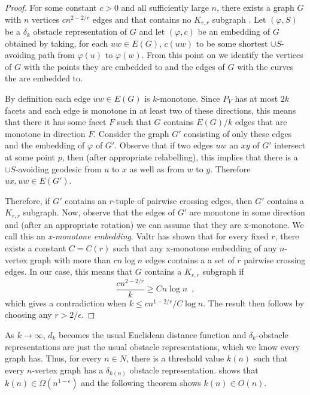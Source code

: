 \documentclass{patmorin}
\begin{document}
\begin{proof}
   For some constant $c>0$ and all sufficiently large $n$, there exists
   a graph $G$ with $n$ vertices $cn^{2-2/r}$ edges and that
   contains no $K_{r,r}$ subgraph \cite{X}.  Let $(\varphi,S)$ be a $\delta_k$
   obstacle representation of $G$ and let $(\varphi,c)$ be an embedding
   of $G$ obtained by taking, for each $uw\in E(G)$, $c(uw)$ to be some
   shortest $\cup S$-avoiding path from $\varphi(u)$ to $\varphi(w)$.
   From this point on we identify the vertices of $G$ with the points
   they are embedded to and the edges of $G$ with the curves the are
   embedded to.

   By definition each edge $uw\in E(G)$ is $k$-monotone.  Since $P_V$ has
   at most $2k$ facets and each edge is monotone in at least two of these
   directions, this means that there it has some facet $F$ such that $G$
   contains $E(G)/k$ edges that are monotone in direction $F$.  Consider
   the graph $G'$ consisting of only these edges and the embedding of
   $\varphi$ of $G'$.   Observe that if two edges $uw$ an $xy$ of $G'$
   intersect at some point $p$, then (after appropriate relabelling),
   this implies that there is a $\cup S$-avoiding geodesic from $u$ to $x$
   as well as from $w$ to $y$.  Therefore $ux,uw\in E(G')$.

   Therefore, if $G'$ contains an $r$-tuple of pairwise crossing edges,
   then $G'$ contains a $K_{r,r}$ subgraph.  Now, observe that the edges
   of $G'$ are monotone in some direction and (after an appropriate
   rotation) we can assume that they are x-monotone.  We call this an
   \emph{x-monotone embedding}.   Valtr \cite{X} has shown that for every
   fixed $r$, there exists a constant $C=C(r)$ such that any x-monotone
   embedding of any $n$-vertex graph with more than $cn\log n$ edges
   contains a a set of $r$ pairwise crossing edges.  In our case, this
   means that $G$ contains a $K_{r,r}$ subgraph if
   \[
       \frac{cn^{2-2/r}}{k} \ge Cn\log n \enspace ,
   \] 
   which gives a contradiction when $k\le cn^{1-2/r}/C\log n$.   The result
   then follows by choosing any $r>2/\epsilon$.
\end{proof}

As $k\to\infty$, $d_k$ becomes the usual Euclidean distance function
and $\delta_k$-obstacle representations are just the usual obstacle
representations, which we know every graph has.  Thus, for every $n\in
N$, there is a threshold value $k(n)$ such that every $n$-vertex graph
has a $\delta_{k(n)}$ obstacle representation.  
shows that $k(n)\in \Omega(n^{1-\epsilon})$
and the following theorem shows $k(n)\in O(n)$.
\end{document}
